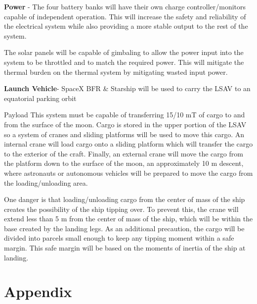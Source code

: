 \documentclass[10pt]{article}
\begin{document}
\textbf{Power} - The four battery banks will have their own charge
controller/monitors capable of independent operation. This will
increase the safety and reliability of the electrical system while
also providing a more stable output to the rest of the system.


The solar panels will be capable of gimbaling to allow the power input
into the system to be throttled and to match the required power. This
will mitigate the thermal burden on the thermal system by mitigating
wasted input power.

\textbf{Launch Vehicle}- SpaceX BFR \& Starship will be used to carry the LSAV
to an equatorial parking orbit

Payload This system must be capable of transferring 15/10 mT of cargo
to and from the surface of the moon. Cargo is stored in the upper
portion of the LSAV so a system of cranes and sliding platforms will
be used to move this cargo. An internal crane will load cargo onto a
sliding platform which will transfer the cargo to the exterior of the
craft. Finally, an external crane will move the cargo from the
platform down to the surface of the moon, an approximately 10 m
descent, where astronauts or autonomous vehicles will be prepared to
move the cargo from the loading/unloading area.

One danger is that loading/unloading cargo from the center of mass of
the ship creates the possibility of the ship tipping over. To prevent
this, the crane will extend less than 5 m from the center of mass of
the ship, which will be within the base created by the landing
legs. As an additional precaution, the cargo will be divided into
parcels small enough to keep any tipping moment within a safe
margin. This safe margin will be based on the moments of inertia of
the ship at landing.


\newpage
\section{Appendix}
\end{document}
